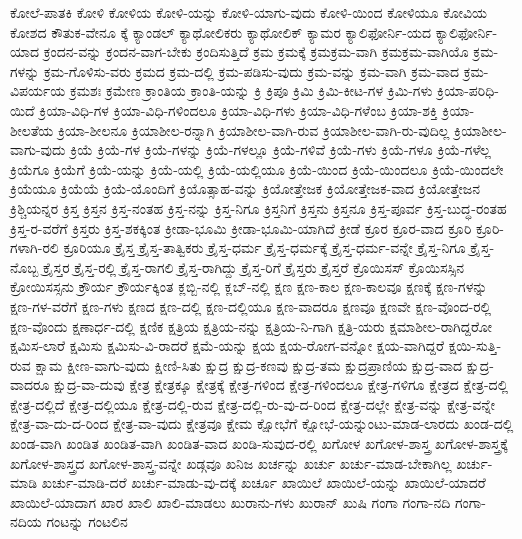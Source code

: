 {ಕೋಲೆ-ಪಾತಕಿ
ಕೋಳಿ
ಕೋಳಿಯ
ಕೋಳಿ-ಯನ್ನು
ಕೋಳಿ-ಯಾಗು-ವುದು
ಕೋಳಿ-ಯಿಂದ
ಕೋಳಿಯೂ
ಕೋವಿಯ
ಕೋಶದ
ಕೌತುಕ-ವೇನೂ
ಕ್ಕೆ
ಕ್ಯಾಂಡಲ್
ಕ್ಯಾಥೋಲಿಕರು
ಕ್ಯಾಥೋಲಿಕ್
ಕ್ಯಾಮರ
ಕ್ಯಾಲಿಫೋರ್ನಿ-ಯದ
ಕ್ಯಾಲಿಫೋರ್ನಿ-ಯಾದ
ಕ್ರಂದನ-ವನ್ನು
ಕ್ರಂದನ-ವಾಗ-ಬೇಕು
ಕ್ರಂದಿಸುತ್ತಿದೆ
ಕ್ರಮ
ಕ್ರಮಕ್ಕೆ
ಕ್ರಮಕ್ರಮ-ವಾಗಿ
ಕ್ರಮಕ್ರಮ-ವಾಗಿಯೊ
ಕ್ರಮ-ಗಳನ್ನು
ಕ್ರಮ-ಗೊಳಿಸು-ವರು
ಕ್ರಮದ
ಕ್ರಮ-ದಲ್ಲಿ
ಕ್ರಮ-ಪಡಿಸು-ವುದು
ಕ್ರಮ-ವನ್ನು
ಕ್ರಮ-ವಾಗಿ
ಕ್ರಮ-ವಾದ
ಕ್ರಮ-ವಿಪರ್ಯಯ
ಕ್ರಮಶಃ
ಕ್ರಮೇಣ
ಕ್ರಾಂತಿಯ
ಕ್ರಾಂತಿ-ಯನ್ನು
ಕ್ರಿ
ಕ್ರಿಪೂ
ಕ್ರಿಮಿ
ಕ್ರಿಮಿ-ಕೀಟ-ಗಳ
ಕ್ರಿಮಿ-ಗಳು
ಕ್ರಿಯಾ-ಪರಿಧಿ-ಯಿದೆ
ಕ್ರಿಯಾ-ವಿಧಿ-ಗಳ
ಕ್ರಿಯಾ-ವಿಧಿ-ಗಳಿಂದಲೂ
ಕ್ರಿಯಾ-ವಿಧಿ-ಗಳು
ಕ್ರಿಯಾ-ವಿಧಿ-ಗಳೆಂಬ
ಕ್ರಿಯಾ-ಶಕ್ತಿ
ಕ್ರಿಯಾ-ಶೀಲತೆಯ
ಕ್ರಿಯಾ-ಶೀಲನೂ
ಕ್ರಿಯಾಶೀಲ-ರನ್ನಾಗಿ
ಕ್ರಿಯಾಶೀಲ-ವಾಗಿ-ರುವ
ಕ್ರಿಯಾಶೀಲ-ವಾಗಿ-ರು-ವುದಿಲ್ಲ
ಕ್ರಿಯಾಶೀಲ-ವಾಗು-ವುದು
ಕ್ರಿಯೆ
ಕ್ರಿಯೆ-ಗಳ
ಕ್ರಿಯೆ-ಗಳನ್ನು
ಕ್ರಿಯೆ-ಗಳಲ್ಲೂ
ಕ್ರಿಯೆ-ಗಳಿವೆ
ಕ್ರಿಯೆ-ಗಳು
ಕ್ರಿಯೆ-ಗಳೂ
ಕ್ರಿಯೆ-ಗಳೆಲ್ಲ
ಕ್ರಿಯೆಗೂ
ಕ್ರಿಯೆಗೆ
ಕ್ರಿಯೆ-ಯನ್ನು
ಕ್ರಿಯೆ-ಯಲ್ಲಿ
ಕ್ರಿಯೆ-ಯಲ್ಲಿಯೂ
ಕ್ರಿಯೆ-ಯಿಂದ
ಕ್ರಿಯೆ-ಯಿಂದಲೂ
ಕ್ರಿಯೆ-ಯಿಂದಲೇ
ಕ್ರಿಯೆಯೂ
ಕ್ರಿಯೆಯೆ
ಕ್ರಿಯೆ-ಯೊಂದಿಗೆ
ಕ್ರಿಯೊತ್ಸಾಹ-ವನ್ನು
ಕ್ರಿಯೋತ್ತೇಜಕ
ಕ್ರಿಯೋತ್ತೇಜಕ-ವಾದ
ಕ್ರಿಯೋತ್ತೇಜನ
ಕ್ರಿಶ್ಚಿಯನ್ನರ
ಕ್ರಿಸ್ತ
ಕ್ರಿಸ್ತನ
ಕ್ರಿಸ್ತ-ನಂತಹ
ಕ್ರಿಸ್ತ-ನನ್ನು
ಕ್ರಿಸ್ತ-ನಿಗೂ
ಕ್ರಿಸ್ತನಿಗೆ
ಕ್ರಿಸ್ತನು
ಕ್ರಿಸ್ತನೂ
ಕ್ರಿಸ್ತ-ಪೂರ್ವ
ಕ್ರಿಸ್ತ-ಬುದ್ಧ-ರಂತಹ
ಕ್ರಿಸ್ತ-ರ-ವರೆಗೆ
ಕ್ರಿಸ್ತರು
ಕ್ರಿಸ್ತ-ಶಕಕ್ಕಿಂತ
ಕ್ರೀಡಾ-ಭೂಮಿ
ಕ್ರೀಡಾ-ಭೂಮಿ-ಯಾಗಿದೆ
ಕ್ರೀಡೆ
ಕ್ರೂರ
ಕ್ರೂರ-ವಾದ
ಕ್ರೂರಿ
ಕ್ರೂರಿ-ಗಳಾಗಿ-ರಲಿ
ಕ್ರೂರಿಯೂ
ಕ್ರೈಸ್ತ
ಕ್ರೈಸ್ತ-ತಾತ್ವಿಕರು
ಕ್ರೈಸ್ತ-ಧರ್ಮ
ಕ್ರೈಸ್ತ-ಧರ್ಮಕ್ಕೆ
ಕ್ರೈಸ್ತ-ಧರ್ಮ-ವನ್ನೇ
ಕ್ರೈಸ್ತ-ನಿಗೂ
ಕ್ರೈಸ್ತ-ನೊಬ್ಬ
ಕ್ರೈಸ್ತರ
ಕ್ರೈಸ್ತ-ರಲ್ಲಿ
ಕ್ರೈಸ್ತ-ರಾಗಲಿ
ಕ್ರೈಸ್ತ-ರಾಗಿದ್ದು
ಕ್ರೈಸ್ತ-ರಿಗೆ
ಕ್ರೈಸ್ತರು
ಕ್ರೈಸ್ತರೆ
ಕ್ರೊಯಿಸಸ್
ಕ್ರೊಯಿಸಸ್ಸಿನ
ಕ್ರೋಯಿಸಸ್ಸನು
ಕ್ರೌರ್ಯ
ಕ್ರೌರ್ಯಕ್ಕಿಂತ
ಕ್ಲಬ್ಬಿ-ನಲ್ಲಿ
ಕ್ಲಬ್-ನಲ್ಲಿ
ಕ್ಷಣ
ಕ್ಷಣ-ಕಾಲ
ಕ್ಷಣ-ಕಾಲವೂ
ಕ್ಷಣಕ್ಕೆ
ಕ್ಷಣ-ಗಳನ್ನು
ಕ್ಷಣ-ಗಳ-ವರೆಗೆ
ಕ್ಷಣ-ಗಳು
ಕ್ಷಣದ
ಕ್ಷಣ-ದಲ್ಲಿ
ಕ್ಷಣ-ದಲ್ಲಿಯೂ
ಕ್ಷಣ-ವಾದರೂ
ಕ್ಷಣವೂ
ಕ್ಷಣವೇ
ಕ್ಷಣ-ವೊಂದ-ರಲ್ಲಿ
ಕ್ಷಣ-ವೊಂದು
ಕ್ಷಣಾರ್ಧ-ದಲ್ಲಿ
ಕ್ಷಣಿಕ
ಕ್ಷತ್ರಿಯ
ಕ್ಷತ್ರಿಯ-ನನ್ನು
ಕ್ಷತ್ರಿಯ-ನಿ-ಗಾಗಿ
ಕ್ಷತ್ರಿ-ಯರು
ಕ್ಷಮಾಶೀಲ-ರಾಗಿದ್ದರೋ
ಕ್ಷಮಿಸ-ಲಾರೆ
ಕ್ಷಮಿಸು
ಕ್ಷಮಿಸು-ವಿ-ರಾದರೆ
ಕ್ಷಮೆ-ಯನ್ನು
ಕ್ಷಯ
ಕ್ಷಯ-ರೋಗ-ವನ್ನೋ
ಕ್ಷಯ-ವಾಗಿದ್ದರೆ
ಕ್ಷಯಿ-ಸುತ್ತಿ-ರುವ
ಕ್ಷಾಮ
ಕ್ಷೀಣ-ವಾಗು-ವುದು
ಕ್ಷೀಣಿ-ಸಿತು
ಕ್ಷುದ್ರ
ಕ್ಷುದ್ರ-ಕಣವು
ಕ್ಷುದ್ರ-ತಮ
ಕ್ಷುದ್ರಪ್ರಾಣಿಯ
ಕ್ಷುದ್ರ-ವಾದ
ಕ್ಷುದ್ರ-ವಾದರೂ
ಕ್ಷುದ್ರ-ವಾ-ದುವು
ಕ್ಷೇತ್ರ
ಕ್ಷೇತ್ರಕ್ಕೂ
ಕ್ಷೇತ್ರಕ್ಕೆ
ಕ್ಷೇತ್ರ-ಗಳಿಂದ
ಕ್ಷೇತ್ರ-ಗಳಿಂದಲೂ
ಕ್ಷೇತ್ರ-ಗಳಿಗೂ
ಕ್ಷೇತ್ರದ
ಕ್ಷೇತ್ರ-ದಲ್ಲಿ
ಕ್ಷೇತ್ರ-ದಲ್ಲಿದೆ
ಕ್ಷೇತ್ರ-ದಲ್ಲಿಯೂ
ಕ್ಷೇತ್ರ-ದಲ್ಲಿ-ರುವ
ಕ್ಷೇತ್ರ-ದಲ್ಲಿ-ರು-ವು-ದ-ರಿಂದ
ಕ್ಷೇತ್ರ-ದಲ್ಲೇ
ಕ್ಷೇತ್ರ-ವನ್ನು
ಕ್ಷೇತ್ರ-ವನ್ನೇ
ಕ್ಷೇತ್ರ-ವಾ-ದು-ದ-ರಿಂದ
ಕ್ಷೇತ್ರ-ವಾ-ವುದು
ಕ್ಷೇತ್ರವೂ
ಕ್ಷೇಮ
ಕ್ಷೋಭೆಗೆ
ಕ್ಷೋಭೆ-ಯನ್ನುಂಟು-ಮಾಡ-ಲಾರದು
ಖಂಡ-ದಲ್ಲಿ
ಖಂಡ-ವಾಗಿ
ಖಂಡಿತ
ಖಂಡಿತ-ವಾಗಿ
ಖಂಡಿತ-ವಾದ
ಖಂಡಿ-ಸುವುದ-ರಲ್ಲಿ
ಖಗೋಳ
ಖಗೋಳ-ಶಾಸ್ತ್ರ
ಖಗೋಳ-ಶಾಸ್ತ್ರಕ್ಕೆ
ಖಗೋಳ-ಶಾಸ್ತ್ರದ
ಖಗೋಳ-ಶಾಸ್ತ್ರ-ವನ್ನೇ
ಖಡ್ಗವೂ
ಖನಿಜ
ಖರ್ಚನ್ನು
ಖರ್ಚು
ಖರ್ಚು-ಮಾಡ-ಬೇಕಾಗಿಲ್ಲ
ಖರ್ಚು-ಮಾಡಿ
ಖರ್ಚು-ಮಾಡಿ-ದರೆ
ಖರ್ಚು-ಮಾಡು-ವು-ದಕ್ಕೆ
ಖರ್ಚೂ
ಖಾಯಿಲೆ
ಖಾಯಿಲೆ-ಯನ್ನು
ಖಾಯಿಲೆ-ಯಾದರೆ
ಖಾಯಿಲೆ-ಯಾದಾಗ
ಖಾರ
ಖಾಲಿ
ಖಾಲಿ-ಮಾಡಲು
ಖುರಾನು-ಗಳು
ಖುರಾನ್
ಖುಷಿ
ಗಂಗಾ
ಗಂಗಾ-ನದಿ
ಗಂಗಾ-ನದಿಯ
ಗಂಟನ್ನು
ಗಂಟಲಿನ
}
